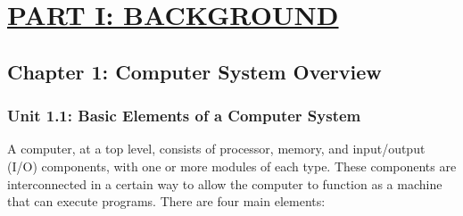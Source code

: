 \documentclass{article}
\begin{document}


\tableofcontents


\newpage

\section*{\underline{PART I: BACKGROUND}}
{}

\subsection*{Chapter 1: Computer System Overview}
{}

\subsubsection*{Unit 1.1: Basic Elements of a Computer System}
{}

A computer, at a top level, consists of processor, memory, and input/output (I/O) components, with
one or more modules of each type. These components are interconnected in a certain way to allow the computer
to function as a machine that can execute programs. There are four main elements:
\end{document}
